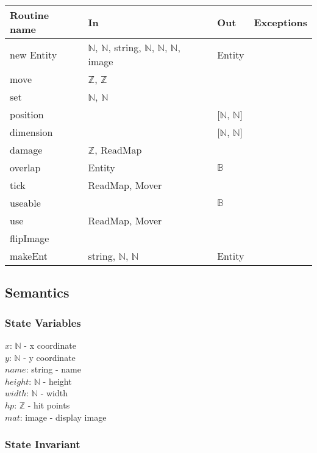 \documentclass[12pt]{article}
\begin{document}
\begin{tabular}{| l | l | l | l |}
\hline
\textbf{Routine name} & \textbf{In} & \textbf{Out} & \textbf{Exceptions}\\
\hline
new Entity & $\mathbb{N}$, $\mathbb{N}$, string, $\mathbb{N}$, $\mathbb{N}$, $\mathbb{N}$, image & Entity & \textcolor{red}{~}\\
\hline
move & $\mathbb{Z}$, $\mathbb{Z}$ & ~ & \textcolor{red}{~}\\
\hline
set & $\mathbb{N}$, $\mathbb{N}$ & ~ & \textcolor{red}{~}\\
\hline
position & ~ & $[ \mathbb{N}$, $\mathbb{N} ]$ & ~\\
\hline
dimension & ~ & $[ \mathbb{N}$, $\mathbb{N} ]$ & ~\\
\hline
damage & $\mathbb{Z}$, ReadMap & ~ & ~\\
\hline
overlap & Entity & $\mathbb{B}$ & ~\\
\hline
tick & ReadMap, Mover & ~ & ~\\
\hline
useable & ~ & $\mathbb{B}$ & ~\\
\hline
use & ReadMap, Mover & ~ & ~\\
\hline
flipImage & ~ & ~ & ~\\
\hline
makeEnt & string, $\mathbb{N}$, $\mathbb{N}$ & Entity & \textcolor{red}{~}\\
\hline
\end{tabular}

\subsection*{Semantics}

\subsubsection*{State Variables}

$x$: $\mathbb{N}$ - x coordinate\\
$y$: $\mathbb{N}$ - y coordinate\\
$name$: string - name\\
$height$: $\mathbb{N}$ - height\\
$width$: $\mathbb{N}$ - width\\
$hp$: $\mathbb{Z}$ - hit points\\
$mat$: image - display image

\subsubsection*{State Invariant}
\end{document}
